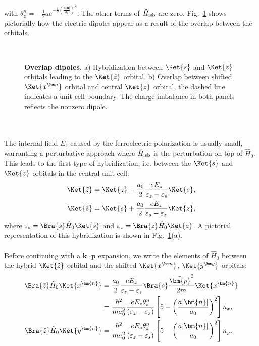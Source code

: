 with $\theta_z^n = -\frac{1}{2}ae^{-\frac{1}{2}\left(\frac{a|\bm{n}|}{a_0}\right)^2}$.
The other terms of $\hat{H}_{\rm isb}$ are zero.
Fig.~\ref{fig:Rashba_overlapdip} shows pictorially how the electric dipoles appear as a result of the overlap between the orbitals. 
\begin{figure}[t]
~\centering
{}\caption{\label{fig:Rashba_overlapdip} {\bf Overlap dipoles.} a) Hybridization between $\Ket{s}$ and $\Ket{z}$ orbitals leading to the $\Ket{\tilde z}$ orbital. b) Overlap between shifted $\Ket{x^{\bm n}}$ orbital and central $\Ket{z}$ orbital, the dashed line indicates a unit cell boundary. The charge imbalance in both panels reflects the nonzero dipole.}
\end{figure}
\\\\
The internal field $E_z$ caused by the ferroelectric polarization is usually small, warranting a perturbative approach where $\hat{H}_{\rm isb}$ is the perturbation on top of $\hat{H}_0$.
This leads to the first type of hybridization, i.e. between the $\Ket{s}$ and $\Ket{z}$ orbitals in the central unit cell:
\begin{align}
	\Ket{\tilde{z}} &= \Ket{z} + \frac{a_0}{2}\frac{e E_z}{\varepsilon_z - \varepsilon_s}\Ket{s},\\
	\Ket{\tilde{s}}   &= \Ket{s} +\frac{a_0}{2}\frac{e E_z}{\varepsilon_s - \varepsilon_z}\Ket{z},
\end{align}
where $\varepsilon_s = \Bra{s} \hat{H}_0 \Ket{s}$ and $\varepsilon_z = \Bra{z} \hat{H}_0 \Ket{z}$. A pictorial representation of this hybridization is shown in Fig.~\ref{fig:Rashba_overlapdip}(a).
\\\\
Before continuing with a $\bm k \cdot \bm p$ expansion, we write the elements of $\hat{H}_0$ between the hybrid $\Ket{\tilde{z}}$ orbital and the shifted $\Ket{x^{\bm n}}$, $\Ket{y^{\bm y}}$ orbitals:
\begin{align}
	\Bra{\tilde{z}} \hat{H}_0 \Ket{x^{\bm{n}}} &=\frac{a_0}{2} \frac{e E_z}{\varepsilon_z - \varepsilon_s}\Bra{s} \frac{\hat{\bm{p}}^2}{2m} \Ket{x^{\bm{n}}}\label{eq:Rashba_momentum_dip}\\
	&= \frac{\hbar^2}{m a_0^2}\frac{e E_z \theta_z^n}{(\varepsilon_z - \varepsilon_s)} \left[5 - \left(\frac{a |\bm{n}|}{a_0}\right)^2\right]n_x,\label{eq:Rashba_momentum_dip1}\\
	\Bra{\tilde{z}} \hat{H}_0 \Ket{y^{\bm{n}}} &=\frac{\hbar^2}{m a_0^2} \frac{e E_z\theta_z^n}{(\varepsilon_z - \varepsilon_s)}\left[5 - \left(\frac{a |\bm{n}|}{a_0}\right)^2\right]n_y\label{eq:Rashba_momentum_dip2}.
\end{align}
